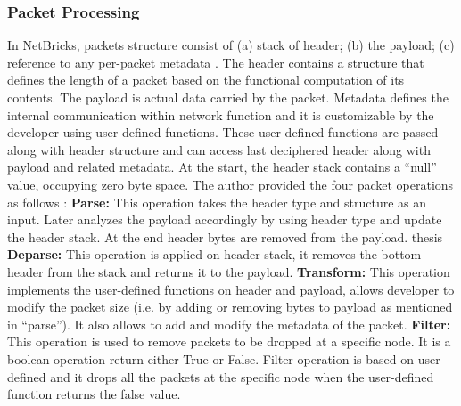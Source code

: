\documentclass[10pt, a4paper, conference]{IEEEtran}
\begin{document}
\subsubsection{Packet Processing}
In NetBricks, packets structure consist of (a) stack of header; (b) the payload; (c) reference to any per-packet metadata \cite{Panda2016}. The header contains a structure that defines the length of a packet based on the functional computation of its contents. The payload is actual data carried by the packet. Metadata defines the internal communication within network function and it is customizable by the developer using user-defined functions. These user-defined functions are passed along with header structure and can access last deciphered header along with payload and related metadata. At the start, the header stack contains a “null” value, occupying zero byte space. The author provided the four packet operations as follows \cite{Panda2016}: 
\newline
\textbf{Parse:} This operation takes the header type and structure as an input. Later analyzes the payload accordingly by using header type and update the header stack. At the end header bytes are removed from the payload.  thesis
\newline
\textbf{Deparse:} This operation is applied on header stack, it removes the bottom header from the stack and returns it to the payload. 
\newline
\textbf{Transform:}  This operation implements the user-defined functions on header and payload, allows developer to modify the packet size (i.e. by adding or removing bytes to payload as mentioned in “parse”). It also allows to add and modify the metadata of the packet. 
\newline
\textbf{Filter:} This operation is used to remove packets to be dropped at a specific node. It is a boolean operation return either True or False. Filter operation is based on user-defined and it drops all the packets at the specific node when the user-defined function returns the false value.
\end{document}

